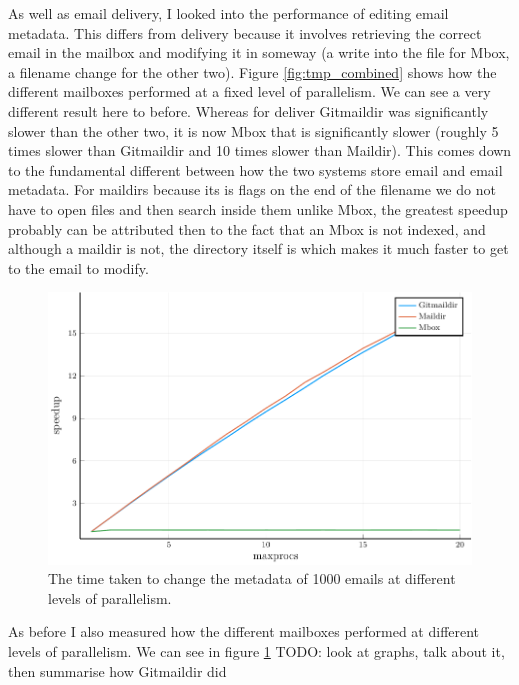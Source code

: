 As well as email delivery, I looked into the performance of editing email metadata. This differs from delivery because it involves retrieving the correct email in the mailbox and modifying it in someway (a write into the file for Mbox, a filename change for the other two). Figure \ref{fig:tmp_combined} shows how the different mailboxes performed at a fixed level of parallelism. We can see a very different result here to before. Whereas for deliver Gitmaildir was significantly slower than the other two, it is now Mbox that is significantly slower (roughly 5 times slower than Gitmaildir and 10 times slower than Maildir). This comes down to the fundamental different between how the two systems store email and email metadata. For maildirs because its is flags on the end of the filename we do not have to open files and then search inside them unlike Mbox, the greatest speedup probably can be attributed then to the fact that an Mbox is not indexed, and although a maildir is not, the directory itself is which makes it much faster to get to the email to modify.

\begin{figure}[h]
    \centering
    \includegraphics{figs/tmpp_speedup_combined}
    \caption{The time taken to change the metadata of 1000 emails at different levels of parallelism.}
    \label{fig:tmpp_speedup_combined}
\end{figure}

As before I also measured how the different mailboxes performed at different levels of parallelism. We can see in figure \ref{fig:tmpp_speedup_combined} TODO: look at graphs, talk about it, then summarise how Gitmaildir did

